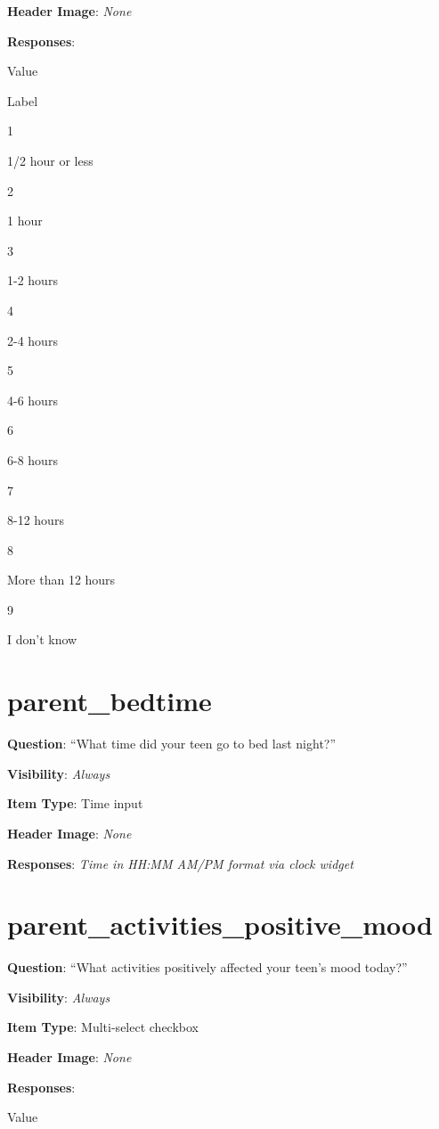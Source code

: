 \documentclass[]{book}
\begin{document}
\textbf{Header Image}: \emph{None}

\textbf{Responses}:

Value

Label

1

1/2 hour or less

2

1 hour

3

1-2 hours

4

2-4 hours

5

4-6 hours

6

6-8 hours

7

8-12 hours

8

More than 12 hours

9

I don't know

\hypertarget{parent_bedtime}{%
\section{parent\_bedtime}\label{parent_bedtime}}

\textbf{Question}: ``What time did your teen go to bed last night?''

\textbf{Visibility}: \emph{Always}

\textbf{Item Type}: Time input

\textbf{Header Image}: \emph{None}

\textbf{Responses}: \emph{Time in HH:MM AM/PM format via clock widget}

\hypertarget{parent_activities_positive_mood}{%
\section{parent\_activities\_positive\_mood}\label{parent_activities_positive_mood}}

\textbf{Question}: ``What activities positively affected your teen's mood today?''

\textbf{Visibility}: \emph{Always}

\textbf{Item Type}: Multi-select checkbox

\textbf{Header Image}: \emph{None}

\textbf{Responses}:

Value
\end{document}
